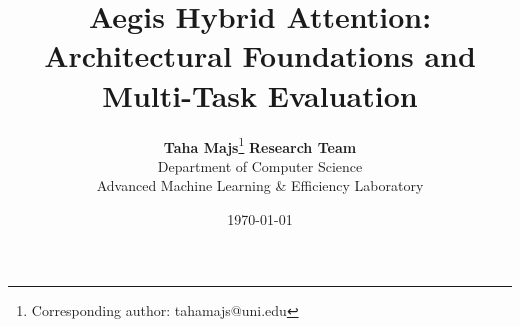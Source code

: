 \title{\textbf{Aegis Hybrid Attention: Architectural Foundations and Multi-Task Evaluation}}

\author{
  \textbf{Taha Majs}\thanks{Corresponding author: tahamajs@uni.edu} \quad \textbf{Research Team} \\
  Department of Computer Science \\
  Advanced Machine Learning \& Efficiency Laboratory
}

\date{\today}
